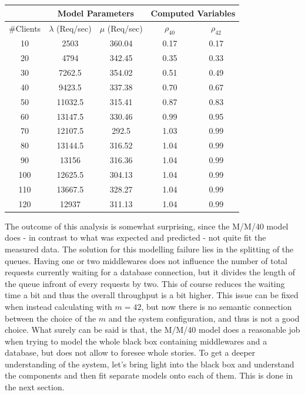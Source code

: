 \documentclass[11pt]{article}
\begin{document}
\begin{center}
	\begin{tabular}{c|c|c||c|c}
		\hline
		& \multicolumn{2}{c||}{Model Parameters} & \multicolumn{2}{c}{Computed Variables} \\
		\hline
		\#Clients & $\lambda$ (Req/sec) & $\mu$ (Req/sec) & $\rho_{40}$ & $\rho_{42}$ \\
		\hline
		10 & 2503 & 360.04 & 0.17 & 0.17 \\
		20 & 4794 & 342.45 & 0.35 & 0.33 \\
		30 & 7262.5 & 354.02 & 0.51 & 0.49 \\
		40 & 9423.5 & 337.38 & 0.70 & 0.67 \\
		50 & 11032.5 & 315.41 & 0.87 & 0.83 \\
		60 & 13147.5 & 330.46 & 0.99 & 0.95 \\
		70 & 12107.5 & 292.5 & 1.03 & 0.99 \\
		80 & 13144.5 & 316.52 & 1.04 & 0.99 \\
		90 & 13156 & 316.36 & 1.04 & 0.99 \\
		100 & 12625.5 & 304.13 & 1.04 & 0.99 \\
		110 & 13667.5 & 328.27 & 1.04 & 0.99 \\
		120 & 12937 & 311.13 & 1.04 & 0.99 \\
		\hline
	\end{tabular}
\end{center}

The outcome of this analysis is somewhat surprising, since the M/M/40 model does - in contrast to what was expected and predicted - not quite fit the measured data. The solution for this modelling failure lies in the splitting of the queues. Having one or two middlewares does not influence the number of total requests currently waiting for a database connection, but it divides the length of the queue infront of every requests by two. This of course reduces the waiting time a bit and thus the overall throughput is a bit higher. This issue can be fixed when instead calculating with $m=42$, but now there is no semantic connection between the choice of the $m$ and the system configuration, and thus is not a good choice. What surely can be said is that, the M/M/40 model does a reasonable job when trying to model the whole black box containing middlewares and a database, but does not allow to foresee whole stories. To get a deeper understanding of the system, let's bring light into the black box and understand the components and then fit separate models onto each of them. This is done in the next section.
\end{document}
